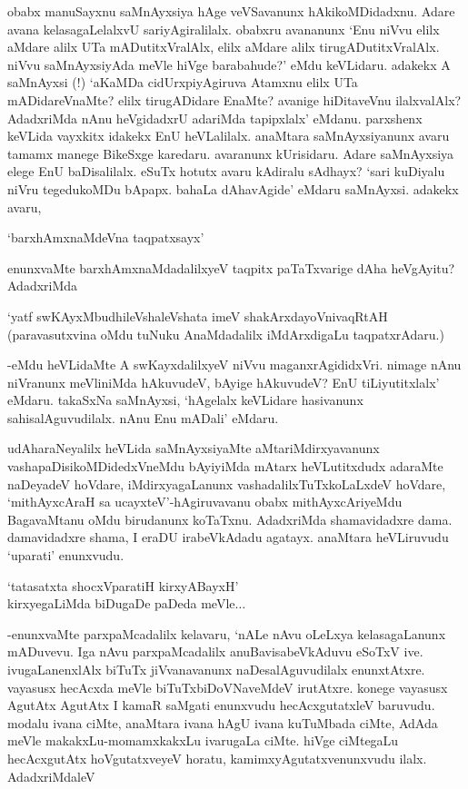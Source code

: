 obabx manuSayxnu saMnAyxsiya hAge veVSavanunx hAkikoMDidadxnu. Adare avana kelasagaLelalxvU sariyAgiralilalx. obabxru avananunx `Enu niVvu elilx aMdare alilx UTa mADutitxVralAlx, elilx aMdare alilx tirugADutitxVralAlx. niVvu saMnAyxsiyAda meVle hiVge barabahude?' eMdu keVLidaru. adakekx A saMnAyxsi (!) `aKaMDa cidUrxpiyAgiruva Atamxnu elilx UTa mADidareVnaMte? elilx tirugADidare EnaMte? avanige hiDitaveVnu ilalxvalAlx? AdadxriMda nAnu heVgidadxrU adariMda tapipxlalx' eMdanu. parxshenx keVLida vayxkitx idakekx EnU heVLalilalx. anaMtara saMnAyxsiyanunx avaru tamamx manege BikeSxge karedaru. avaranunx kUrisidaru. Adare saMnAyxsiya elege EnU baDisalilalx. eSuTx hotutx avaru kAdiralu sAdhayx? `sari kuDiyalu niVru tegedukoMDu bApapx. bahaLa dAhavAgide' eMdaru saMnAyxsi. adakekx avaru,

\begin{shloka}
`barxhAmxnaMdeVna taqpatxsayx'
\end{shloka}

enunxvaMte barxhAmxnaMdadalilxyeV taqpitx paTaTxvarige dAha heVgAyitu? AdadxriMda

\begin{shloka}
`yatf swKAyxMbudhileVshaleVshata imeV shakArxdayoVnivaqRtAH\\
(paravasutxvina oMdu tuNuku AnaMdadalilx iMdArxdigaLu taqpatxrAdaru.)
\end{shloka}

-eMdu heVLidaMte A swKayxdalilxyeV niVvu maganxrAgididxVri. nimage nAnu niVranunx meVliniMda hAkuvudeV, bAyige hAkuvudeV? EnU tiLiyutitxlalx' eMdaru. takaSxNa saMnAyxsi, `hAgelalx keVLidare hasivanunx sahisalAguvudilalx. nAnu Enu mADali' eMdaru.

udAharaNeyalilx heVLida saMnAyxsiyaMte aMtariMdirxyavanunx vashapaDisikoMDidedxVneMdu bAyiyiMda mAtarx heVLutitxdudx adaraMte naDeyadeV hoVdare, iMdirxyagaLanunx vashadalilxTuTxkoLaLxdeV hoVdare, `mithAyxcAraH sa ucayxteV'-hAgiruvavanu obabx mithAyxcAriyeMdu BagavaMtanu oMdu birudanunx koTaTxnu. AdadxriMda shamavidadxre dama. damavidadxre shama, I eraDU irabeVkAdadu agatayx. anaMtara heVLiruvudu `uparati' enunxvudu.

\begin{shloka}
`tatasatxta shocxVparatiH kirxyABayxH'\\
kirxyegaLiMda biDugaDe paDeda meVle$\ldots$ 
\end{shloka}

-enunxvaMte parxpaMcadalilx kelavaru, `nALe nAvu oLeLxya kelasagaLanunx mADuvevu. Iga nAvu parxpaMcadalilx anuBavisabeVkAduvu eSoTxV ive. ivugaLanenxlAlx biTuTx jiVvanavanunx naDesalAguvudilalx enunxtAtxre. vayasusx hecAcxda meVle biTuTxbiDoVNaveMdeV irutAtxre. konege vayasusx AgutAtx AgutAtx I kamaR saMgati enunxvudu hecAcxgutatxleV baruvudu. modalu ivana ciMte, anaMtara ivana hAgU ivana kuTuMbada ciMte, AdAda meVle makakxLu-momamxkakxLu ivarugaLa ciMte. hiVge ciMtegaLu hecAcxgutAtx hoVgutatxveyeV horatu, kamimxyAgutatxvenunxvudu ilalx. AdadxriMdaleV

